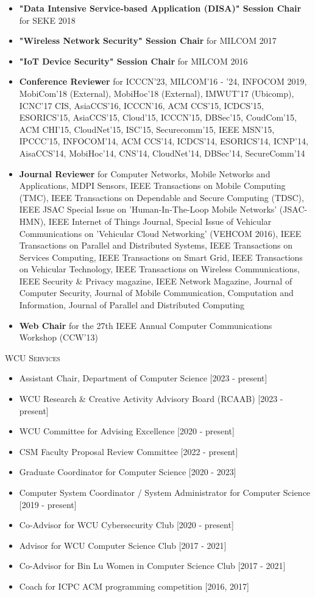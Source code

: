 \documentclass[letter]{article}
\newcommand{\heading}[1]{\item \large \textsc{#1} \normalsize}
\begin{document}
\begin{description}
\begin{itemize}
\item \textbf{"Data Intensive Service-based Application (DISA)" Session Chair} for SEKE 2018
\item \textbf{"Wireless Network Security" Session Chair} for MILCOM 2017
\item \textbf{"IoT Device Security" Session Chair} for MILCOM 2016
\item \textbf{Conference Reviewer} for ICCCN'23, MILCOM'16 - '24, INFOCOM 2019, MobiCom'18 (External), MobiHoc'18 (External), IMWUT'17 (Ubicomp), ICNC'17 CIS, AsiaCCS'16, ICCCN'16, ACM CCS'15, ICDCS'15, ESORICS'15, AsiaCCS'15, Cloud'15, ICCCN'15, DBSec'15, CoudCom'15, ACM CHI'15, CloudNet'15, ISC'15, Securecomm'15, IEEE MSN'15, IPCCC'15, INFOCOM'14, ACM CCS'14, ICDCS'14, ESORICS'14, ICNP'14, AisaCCS'14, MobiHoc'14, CNS'14, CloudNet'14, DBSec'14, SecureComm'14
\item \textbf{Journal Reviewer} for Computer Networks, Mobile Networks and Applications, MDPI Sensors, IEEE Transactions on Mobile Computing (TMC), IEEE Transactions on Dependable and Secure Computing (TDSC), IEEE JSAC Special Issue on 'Human-In-The-Loop Mobile Networks' (JSAC-HMN), IEEE Internet of Things Journal, Special Issue of Vehicular Communications on 'Vehicular Cloud Networking' (VEHCOM 2016), IEEE Transactions on Parallel and Distributed Systems, IEEE Transactions on Services Computing, IEEE Transactions on Smart Grid, IEEE Transactions on Vehicular Technology, IEEE Transactions on Wireless Communications, IEEE Security \& Privacy magazine, IEEE Network Magazine, Journal of Computer Security, Journal of Mobile Communication, Computation and Information, Journal of Parallel and Distributed Computing
\item \textbf{Web Chair} for the 27th IEEE Annual Computer Communications Workshop (CCW'13)
\end{itemize}

\heading{WCU Services}

\begin{itemize}
\item Assistant Chair, Department of Computer Science [2023 - present]
\item WCU Research \& Creative Activity Advisory Board (RCAAB) [2023 - present]
\item WCU Committee for Advising Excellence [2020 - present]
\item CSM Faculty Proposal Review Committee [2022 - present]
\item Graduate Coordinator for Computer Science [2020 - 2023]
\item Computer System Coordinator / System Administrator for Computer Science [2019 - present]
\item Co-Advisor for WCU Cybersecurity Club [2020 - present]
\item Advisor for WCU Computer Science Club [2017 - 2021]
\item Co-Advisor for Bin Lu Women in Computer Science Club [2017 - 2021]
\item Coach for ICPC ACM programming competition [2016, 2017]
\end{itemize}


\end{description}
\end{document}
